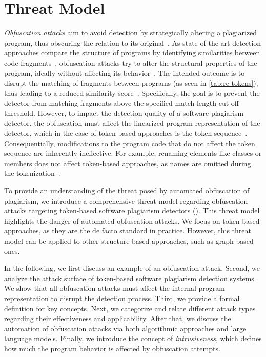 \chapter{Threat Model}\label{cha:threatmodel}

\noindent
\textit{Obfuscation attacks} aim to avoid detection by strategically altering a plagiarized program, thus obscuring the relation to its original~\cite{Saglam2024b}.
As state-of-the-art detection approaches compare the structure of programs by identifying similarities between code fragments~\cite{Nichols2019}, obfuscation attacks try to alter the structural properties of the program, ideally without affecting its behavior~\cite{Novak2020, Karnalim2016, Pawelczak2018}.
The intended outcome is to disrupt the matching of fragments between programs (as seen in \autoref{tab:re-tokens}), thus leading to a reduced similarity score~\cite{DevoreMcDonald2020}.
Specifically, the goal is to prevent the detector from matching fragments above the specified match length cut-off threshold.
However, to impact the detection quality of a software plagiarism detector, the obfuscation must affect the linearized program representation of the detector, which in the case of token-based approaches is the token sequence~\cite{Saglam2024b}. Consequentially, modifications to the program code that do not affect the token sequence are inherently ineffective. For example, renaming elements like classes or members does not affect token-based approaches, as names are omitted during the tokenization~\cite{prechelt2000, Saglam2024a}.

To provide an understanding of the threat posed by automated obfuscation of plagiarism, we introduce a comprehensive threat model regarding obfuscation attacks targeting token-based software plagiarism detectors (). This threat model highlights the danger of automated obfuscation attacks.
%
We focus on token-based approaches, as they are the de facto standard in practice. However, this threat model can be applied to other structure-based approaches, such as graph-based ones.

In the following, we first discuss an example of an obfuscation attack.
Second, we analyze the attack surface of token-based software plagiarism detection systems. We show that all obfuscation attacks must affect the internal program representation to disrupt the detection process.
Third, we provide a formal definition for key concepts.
Next, we categorize and relate different attack types regarding their effectiveness and applicability.
After that, we discuss the automation of obfuscation attacks via both algorithmic approaches and large language models.
Finally, we introduce the concept of \textit{intrusiveness}, which defines how much the program behavior is affected by obfuscation attempts.

